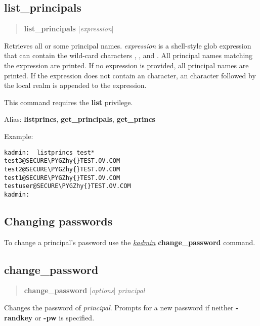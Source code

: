 \documentclass[letterpaper,10pt,english]{sphinxmanual}
\def\PYGZhy{\char`\-}
\begin{document}
\subsection{list\_principals}
\label{admin/database:list-principals}\begin{quote}

\textbf{list\_principals} {[}\emph{expression}{]}
\end{quote}

Retrieves all or some principal names.  \emph{expression} is a shell-style
glob expression that can contain the wild-card characters ,
\code{*}, and \code{{[}{]}}.  All principal names matching the expression are
printed.  If no expression is provided, all principal names are
printed.  If the expression does not contain an  character, an
 character followed by the local realm is appended to the
expression.

This command requires the \textbf{list} privilege.

Alias: \textbf{listprincs}, \textbf{get\_principals}, \textbf{get\_princs}

Example:

\begin{Verbatim}[commandchars=\\\{\}]
kadmin:  listprincs test*
test3@SECURE\PYGZhy{}TEST.OV.COM
test2@SECURE\PYGZhy{}TEST.OV.COM
test1@SECURE\PYGZhy{}TEST.OV.COM
testuser@SECURE\PYGZhy{}TEST.OV.COM
kadmin:
\end{Verbatim}


\subsection{Changing passwords}
\label{admin/database:changing-passwords}
To change a principal's password use the {\hyperref[admin/admin_commands/kadmin_local:kadmin-1]{\emph{kadmin}}}
\textbf{change\_password} command.


\subsection{change\_password}
\label{admin/database:change-password}\begin{quote}

\textbf{change\_password} {[}\emph{options}{]} \emph{principal}
\end{quote}

Changes the password of \emph{principal}.  Prompts for a new password if
neither \textbf{-randkey} or \textbf{-pw} is specified.
\end{document}
